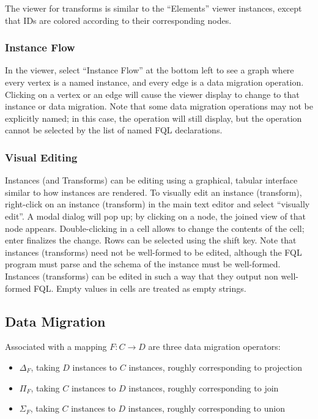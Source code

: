 \documentclass[12pt]{article}
\begin{document}
The viewer for transforms is similar to the ``Elements'' viewer instances, except that IDs are colored according to their corresponding nodes.

\subsubsection{Instance Flow}
In the viewer, select ``Instance Flow'' at the bottom left to see a graph where every vertex is a named instance, and every edge is a data migration operation.  Clicking on a vertex or an edge will cause the viewer display to change to that instance or data migration.  Note that some data migration operations may not be explicitly named; in this case, the operation will still display, but the operation cannot be selected by the list of named FQL declarations.


\subsubsection{Visual Editing}

Instances (and Transforms) can be editing using a graphical, tabular interface similar to how instances are rendered.  To visually edit an instance (transform), right-click on an instance (transform) in the main text editor and select ``visually edit''.  A modal dialog will pop up; by clicking on a node, the joined view of that node appears.  Double-clicking in a cell allows to change the contents of the cell; enter finalizes the change.  Rows can be selected using the shift key.  Note that instances (transforms) need not be well-formed to be edited, although the FQL program must parse and the schema of the instance must be well-formed.  Instances (transforms) can be edited in such a way that they output non well-formed FQL.  Empty values in cells are treated as empty strings.  

\subsection{Data Migration}

Associated with a mapping $F : C \to D$ are three data migration operators:
\begin{itemize}
\item $\Delta_F$, taking $D$ instances to $C$ instances, roughly corresponding to projection
\item $\Pi_F$, taking $C$ instances to $D$ instances, roughly corresponding to join
\item $\Sigma_F$, taking $C$ instances to $D$ instances, roughly corresponding to union
\end{itemize}
\end{document}
